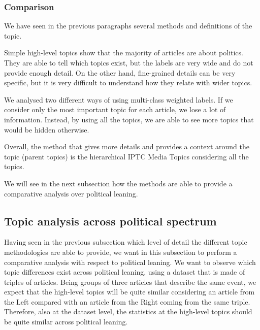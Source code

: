 
\subsubsection{\statusgreen Comparison}

We have seen in the previous paragraphs several methods and definitions of the topic.

Simple high-level topics show that the majority of articles are about politics. They are able to tell which topics exist, but the labels are very wide and do not provide enough detail.
On the other hand, fine-grained details can be very specific, but it is very difficult to understand how they relate with wider topics.

We analysed two different ways of using multi-class weighted labels. If we consider only the most important topic for each article, we lose a lot of information. Instead, by using all the topics, we are able to see more topics that would be hidden otherwise.

Overall, the method that gives more details and provides a context around the topic (parent topics) is the hierarchical IPTC Media Topics considering all the topics.

We will see in the next subsection how the methods are able to provide a comparative analysis over political leaning.



\subsection{\statusgreen Topic analysis across political spectrum}
\label{ssec:topics_topics_leaning}

Having seen in the previous subsection which level of detail the different topic methodologies are able to provide, we want in this subsection to perform a comparative analysis with respect to political leaning.
We want to observe which topic differences exist across political leaning, using a dataset that is made of triples of articles.
Being groups of three articles that describe the same event, we expect that the high-level topics will be quite similar considering an article from the Left compared with an article from the Right coming from the same triple.
Therefore, also at the dataset level, the statistics at the high-level topics should be quite similar across political leaning.

